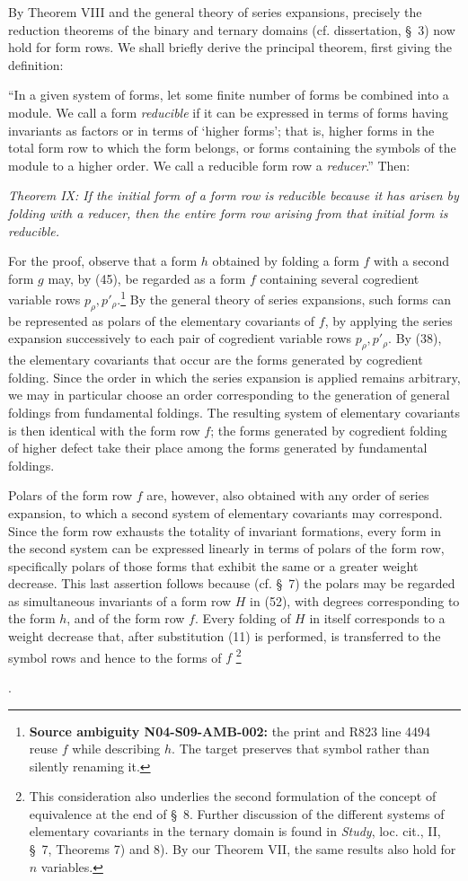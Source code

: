\documentclass[11pt]{article}
\newcommand{\NoetherSrcNote}[2]{%
  \begingroup
  \renewcommand{\thefootnote}{\ensuremath{[\mathrm{#1}]}}%
  \footnote{#2}%
  \endgroup
  \addtocounter{footnote}{-1}%
}
\begin{document}
By Theorem VIII and the general theory of series expansions, precisely the
reduction theorems of the binary and ternary domains (cf. dissertation,
\S\ 3) now hold for form rows. We shall briefly derive the principal
theorem, first giving the definition:

``In a given system of forms, let some finite number of forms be combined
into a module. We call a form \emph{reducible} if it can be expressed in
terms of forms having invariants as factors or in terms of `higher forms';
that is, higher forms in the total form row to which the form belongs, or
forms containing the symbols of the module to a higher order. We call a
reducible form row a \emph{reducer}.'' Then:

\emph{Theorem IX: If the initial form of a form row is reducible because it
has arisen by folding with a reducer, then the entire form row arising from
that initial form is reducible.}

For the proof, observe that a form $h$ obtained by folding a form $f$ with a
second form $g$ may, by (45), be regarded as a form $f$ containing several
cogredient variable rows $p_\rho,p'_\rho$.\footnote{\textbf{Source
ambiguity N04-S09-AMB-002:} the print and R823 line 4494 reuse $f$ while
describing $h$. The target preserves that symbol rather than silently
renaming it.} By the general theory of series
expansions, such forms can be
represented as polars of the elementary covariants of $f$, by applying the
series expansion successively to each pair of cogredient variable rows
$p_\rho,p'_\rho$. By (38), the elementary covariants that occur are the
forms generated by cogredient folding. Since the order in which the series
expansion is applied remains arbitrary, we may in particular choose an
order corresponding to the generation of general foldings from fundamental
foldings. The resulting system of elementary covariants is then identical
with the form row $f$; the forms generated by cogredient folding of higher
defect take their place among the forms generated by fundamental foldings.

Polars of the form row $f$ are, however, also obtained with any order of
series expansion, to which a second system of elementary covariants may
correspond. Since the form row exhausts the totality of invariant
formations, every form in the second system can be expressed linearly in
terms of polars of the form row, specifically polars of those forms that
exhibit the same or a greater weight decrease. This last assertion follows
because (cf. \S\ 7) the polars may be regarded as simultaneous invariants
of a form row $H$ in (52), with degrees corresponding to the form $h$, and
of the form row $f$. Every folding of $H$ in itself corresponds to a weight
decrease that, after substitution (11) is performed, is transferred to the
symbol rows and hence to the forms of $f$\NoetherSrcNote{154:*}{This
consideration also underlies the second formulation of the concept of
equivalence at the end of \S\ 8. Further discussion of the different
systems of elementary covariants in the ternary domain is found in
\emph{Study}, loc. cit., II, \S\ 7, Theorems 7) and 8). By our Theorem VII,
the same results also hold for $n$ variables.}.
\end{document}
